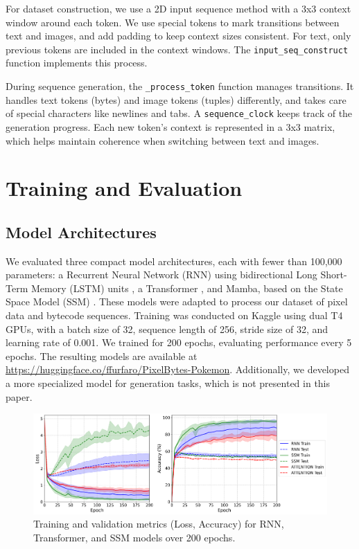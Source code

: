 \documentclass[10pt,a4paper]{article}
\begin{document}
For dataset construction, we use a 2D input sequence method with a 3x3 context window around each token. We use special tokens to mark transitions between text and images, and add padding to keep context sizes consistent. For text, only previous tokens are included in the context windows. The \texttt{input\_seq\_construct} function implements this process.

During sequence generation, the \texttt{\_process\_token} function manages transitions. It handles text tokens (bytes) and image tokens (tuples) differently, and takes care of special characters like newlines and tabs. A \texttt{sequence\_clock} keeps track of the generation progress. Each new token's context is represented in a 3x3 matrix, which helps maintain coherence when switching between text and images.

\section{Training and Evaluation}

\subsection{Model Architectures}
We evaluated three compact model architectures, each with fewer than 100,000 parameters: a Recurrent Neural Network (RNN) using bidirectional Long Short-Term Memory (LSTM) units \cite{hochreiter1997long}, a Transformer \cite{vaswani2017attention}, and Mamba, based on the State Space Model (SSM) \cite{gu2022efficiently}. These models were adapted to process our dataset of pixel data and bytecode sequences. Training was conducted on Kaggle using dual T4 GPUs, with a batch size of 32, sequence length of 256, stride size of 32, and learning rate of 0.001. We trained for 200 epochs, evaluating performance every 5 epochs. The resulting models are available at \url{https://huggingface.co/ffurfaro/PixelBytes-Pokemon}. Additionally, we developed a more specialized model for generation tasks, which is not presented in this paper.

\begin{figure}[htbp]
\centering
\includegraphics[width=\textwidth]{training_results.png}
\caption{Training and validation metrics (Loss, Accuracy) for RNN, Transformer, and SSM models over 200 epochs.}
\label{fig:training_results}
\end{figure}
\end{document}
